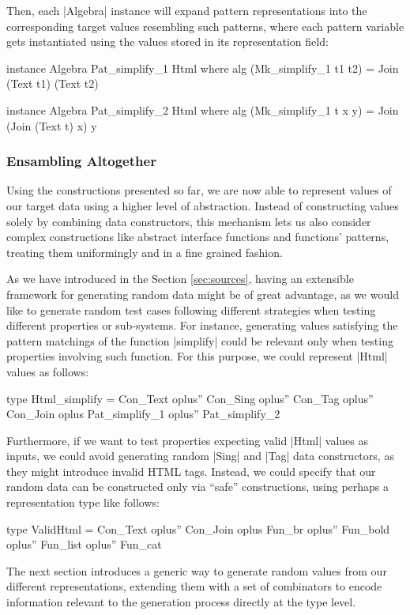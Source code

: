 Then, each |Algebra| instance will expand pattern representations into the
corresponding target values resembling such patterns, where each pattern
variable gets instantiated using the values stored in its representation field:

\begin{code}
instance Algebra Pat_simplify_1 Html where
  alg (Mk_simplify_1 t1 t2) = Join (Text t1) (Text t2)

instance Algebra Pat_simplify_2 Html where
  alg (Mk_simplify_1 t x y) = Join (Join (Text t) x) y
\end{code}


%
%
\subsubsection{Ensambling Altogether}

Using the constructions presented so far, we are now able to represent values of
our target data using a higher level of abstraction.
%
Instead of constructing values solely by combining data constructors, this
mechanism lets us also consider complex constructions like abstract interface
functions and functions' patterns, treating them uniformingly and in a fine
grained fashion.


As we have introduced in the Section \ref{sec:sources}, having an extensible
framework for generating random data might be of great advantage, as we would
like to generate random test cases following different strategies when testing
different properties or sub-systems.
%
For instance, generating values satisfying the pattern matchings of the function
|simplify| could be relevant only when testing properties involving such
function.
%
For this purpose, we could represent |Html| values as follows:
%
\begin{code}
type Html_simplify  =      Con_Text oplus'' Con_Sing oplus'' Con_Tag oplus'' Con_Join
                    oplus  Pat_simplify_1 oplus'' Pat_simplify_2
\end{code}



Furthermore, if we want to test properties expecting valid |Html| values as
inputs, we could avoid generating random |Sing| and |Tag| data constructors, as
they might introduce invalid HTML tags.
%
Instead, we could specify that our random data can be constructed only via
``safe'' constructions, using perhaps a representation type like follows:

\begin{code}
type ValidHtml  =      Con_Text oplus'' Con_Join
                oplus  Fun_br oplus'' Fun_bold oplus'' Fun_list oplus'' Fun_cat
\end{code}


The next section introduces a generic way to generate random values from our
different representations, extending them with a set of combinators to encode
information relevant to the generation process directly at the type level.
